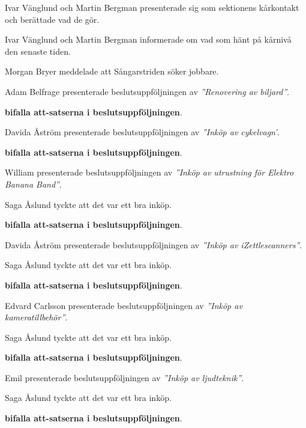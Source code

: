 \documentclass[10pt]{article}
\begin{document}
\begin{paragrafer}
Ivar Vänglund och Martin Bergman presenterade sig som sektionens kårkontakt och berättade vad de gör. 

Ivar Vänglund och Martin Bergman informerade om vad som hänt på kårnivå den senaste tiden. 

Morgan Bryer meddelade att Sångarstriden söker jobbare.


Adam Belfrage presenterade beslutsuppföljningen av \emph{''Renovering av biljard''}.

\textbf{\Mba bifalla att-satserna i beslutsuppföljningen}.


Davida Åström presenterade beslutsuppföljningen av \emph{''Inköp av cykelvagn'}.

\textbf{\Mba bifalla att-satserna i beslutsuppföljningen}.

William presenterade beslutsuppföljningen av \emph{''Inköp av utrustning för Elektro Banana Band''}.

Saga Åslund tyckte att det var ett bra inköp. 

\textbf{\Mba bifalla att-satserna i beslutsuppföljningen}.

Davida Åström presenterade beslutsuppföljningen av \emph{''Inköp av iZettlescanners''}.

Saga Åslund tyckte att det var ett bra inköp. 

\textbf{\Mba bifalla att-satserna i beslutsuppföljningen}.

Edvard Carlsson presenterade beslutsuppföljningen av \emph{''Inköp av kameratillbehör''}.

Saga Åslund tyckte att det var ett bra inköp. 

\textbf{\Mba bifalla att-satserna i beslutsuppföljningen}.

Emil presenterade beslutsuppföljningen av \emph{''Inköp av ljudteknik''}.

Saga Åslund tyckte att det var ett bra inköp. 

\textbf{\Mba bifalla att-satserna i beslutsuppföljningen}.


\end{paragrafer}
\end{document}
